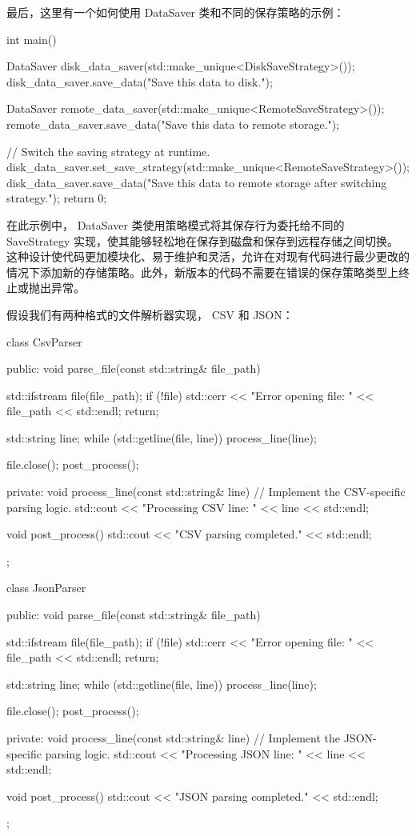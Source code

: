 最后，这里有一个如何使用 DataSaver 类和不同的保存策略的示例：

\begin{cpp}
int main() {
    DataSaver disk_data_saver(std::make_unique<DiskSaveStrategy>());
    disk_data_saver.save_data("Save this data to disk.");

    DataSaver remote_data_saver(std::make_unique<RemoteSaveStrategy>());
    remote_data_saver.save_data("Save this data to remote storage.");

    // Switch the saving strategy at runtime.
    disk_data_saver.set_save_strategy(std::make_unique<RemoteSaveStrategy>());
    disk_data_saver.save_data("Save this data to remote storage after switching strategy.");
    return 0;
}
\end{cpp}

在此示例中， DataSaver 类使用策略模式将其保存行为委托给不同的 SaveStrategy 实现，使其能够轻松地在保存到磁盘和保存到远程存储之间切换。这种设计使代码更加模块化、易于维护和灵活，允许在对现有代码进行最少更改的情况下添加新的存储策略。此外，新版本的代码不需要在错误的保存策略类型上终止或抛出异常。

假设我们有两种格式的文件解析器实现， CSV 和 JSON：

\begin{cpp}
class CsvParser {
public:
    void parse_file(const std::string& file_path) {
        std::ifstream file(file_path);
        if (!file) {
            std::cerr << "Error opening file: " << file_path << std::endl;
            return;
        }

        std::string line;
        while (std::getline(file, line)) {
            process_line(line);
        }

        file.close();
        post_process();
    }

private:
    void process_line(const std::string& line) {
        // Implement the CSV-specific parsing logic.
        std::cout << "Processing CSV line: " << line << std::endl;
    }

    void post_process() {
        std::cout << "CSV parsing completed." << std::endl;
    }
};

class JsonParser {
public:
    void parse_file(const std::string& file_path) {
        std::ifstream file(file_path);
        if (!file) {
            std::cerr << "Error opening file: " << file_path << std::endl;
            return;
        }

        std::string line;
        while (std::getline(file, line)) {
            process_line(line);
        }

        file.close();
        post_process();
    }

private:
    void process_line(const std::string& line) {
        // Implement the JSON-specific parsing logic.
        std::cout << "Processing JSON line: " << line << std::endl;
    }

    void post_process() {
        std::cout << "JSON parsing completed." << std::endl;
    }
};
\end{cpp}

